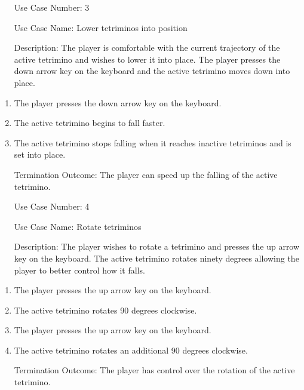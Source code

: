 \documentclass[10pt,conference,onecolumn,compsoc]{IEEEtran}
\begin{document}
\begin{itemize}
\item[Use Case Number:] 3
\item[Use Case Name:] Lower tetriminos into position
\item[Description:] The player is comfortable with the current trajectory of the active tetrimino and wishes to lower it into place. The player presses the down arrow key on the keyboard and the active tetrimino moves down into place.
\end{itemize}

\begin{enumerate}
\item The player presses the down arrow key on the keyboard.
\item The active tetrimino begins to fall faster.
\item The active tetrimino stops falling when it reaches inactive tetriminos and is set into place.
\item[Termination Outcome:] The player can speed up the falling of the active tetrimino.
\end{enumerate}

\begin{itemize}
\item[Use Case Number:] 4
\item[Use Case Name:] Rotate tetriminos
\item[Description:] The player wishes to rotate a tetrimino and presses the up arrow key on the keyboard. The active tetrimino rotates ninety degrees allowing the player to better control how it falls.
\end{itemize}

\begin{enumerate}
\item The player presses the up arrow key on the keyboard.
\item The active tetrimino rotates 90 degrees clockwise.
\item The player presses the up arrow key on the keyboard.
\item The active tetrimino rotates an additional 90 degrees clockwise.
\item[Termination Outcome:] The player has control over the rotation of the active tetrimino.
\end{enumerate}
\end{document}

